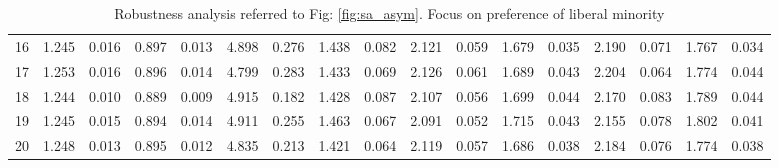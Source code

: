 \documentclass{article}
\begin{document}
\begin{table}[H]
{\begin{tabular}{|c|c|c|c|c|c|c|c|c|c|c|c|c|c|c|c|c|}
    16 & 1.245 & 0.016 & 0.897 & 0.013 & 4.898 & 0.276 & 1.438 & 0.082 & 2.121 & 0.059 & 1.679 & 0.035 & 2.190 & 0.071 & 1.767 & 0.034 \\ 
    17 & 1.253 & 0.016 & 0.896 & 0.014 & 4.799 & 0.283 & 1.433 & 0.069 & 2.126 & 0.061 & 1.689 & 0.043 & 2.204 & 0.064 & 1.774 & 0.044 \\ 
    18 & 1.244 & 0.010 & 0.889 & 0.009 & 4.915 & 0.182 & 1.428 & 0.087 & 2.107 & 0.056 & 1.699 & 0.044 & 2.170 & 0.083 & 1.789 & 0.044 \\ 
    19 & 1.245 & 0.015 & 0.894 & 0.014 & 4.911 & 0.255 & 1.463 & 0.067 & 2.091 & 0.052 & 1.715 & 0.043 & 2.155 & 0.078 & 1.802 & 0.041 \\ 
    20 & 1.248 & 0.013 & 0.895 & 0.012 & 4.835 & 0.213 & 1.421 & 0.064 & 2.119 & 0.057 & 1.686 & 0.038 & 2.184 & 0.076 & 1.774 & 0.038 \\ 
   \hline
\end{tabular}
}

\caption{Robustness analysis referred to Fig: \ref{fig:sa_asym}. Focus on preference of liberal minority}
\label{tab:sa_asym_vllbmn}
\end{table}
\end{document}
